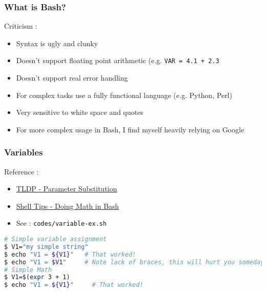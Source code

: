 \documentclass{beamer}
\newcommand{\code}[1]{\colorbox{codegray}{\texttt{#1}}}
\begin{document}
\begin{frame}
\frametitle{What is Bash?}
Criticism : 
\begin{itemize}
    \item Syntax is ugly and clunky
    \pause
    \item Doesn't support floating point arithmetic (e.g. \code{VAR = 4.1 + 2.3}
    \pause
    \item Doesn't support real error handling
    \pause
    \item For complex tasks use a fully functional language (e.g. Python, Perl)
    \pause
    \item Very sensitive to white space and quotes
    \pause
    \item For more complex usage in Bash, I find myself heavily relying on Google
\end{itemize}
\end{frame}



\begin{frame}[fragile]
\frametitle{Variables}
Reference :
\begin{itemize}
    \item \href{https://tldp.org/LDP/abs/html/parameter-substitution.html}{TLDP - Parameter Substitution}
    \pause
    \item \href{https://www.shell-tips.com/bash/math-arithmetic-calculation/}{Shell Tips - Doing Math in Bash}
    \pause
    \item See : \code{codes/variable-ex.sh}
\end{itemize}
\begingroup
\scriptsize
\begin{lstlisting}[backgroundcolor = \color{codegray}, language = Bash, showstringspaces=false]
# Simple variable assignment
$ V1="my simple string"
$ echo "V1 = ${V1}"   # That worked!
$ echo "V1 = $V1"     # Note lack of braces, this will hurt you someday
# Simple Math
$ V1=$(expr 3 + 1)
$ echo "V1 = ${V1}"     # That worked! 
\end{lstlisting}
\endgroup
\end{frame}
\end{document}
